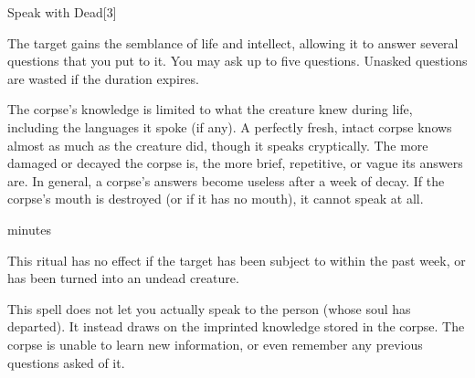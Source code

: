 \begin{spellsection}{Speak with Dead}[3]
    \begin{spellheader}
    \end{spellheader}
    \begin{spellcontent}
        \begin{spelltargetinginfo}
        \end{spelltargetinginfo}
        \begin{spelleffects}
            \spelleffect The target gains the semblance of life and intellect, allowing it to answer several questions that you put to it. You may ask up to five questions. Unasked questions are wasted if the duration expires.

            The corpse's knowledge is limited to what the creature knew during life, including the languages it spoke (if any). A perfectly fresh, intact corpse knows almost as much as the creature did, though it speaks cryptically. The more damaged or decayed the corpse is, the more brief, repetitive, or vague its answers are. In general, a corpse's answers become useless after a week of decay. If the corpse's mouth is destroyed (or if it has no mouth), it cannot speak at all.

             minutes \dismissable
        \end{spelleffects}
    \end{spellcontent}
    \begin{spellfooter}
        \spellnotes This ritual has no effect if the target has been subject to  within the past week, or has been turned into an undead creature.

        \par This spell does not let you actually speak to the person (whose soul has departed). It instead draws on the imprinted knowledge stored in the corpse. The corpse is unable to learn new information, or even remember any previous questions asked of it.
    \end{spellfooter}
\end{spellsection}

